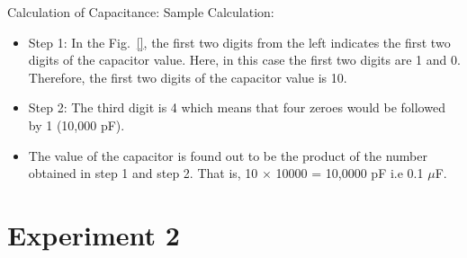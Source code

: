 \documentclass[9pt]{scrreprt}
\begin{document}
Calculation of Capacitance:
Sample Calculation:
\begin{itemize}
\item Step 1: In the Fig.~\ref{}, the first two digits from the left indicates the first two digits of the
capacitor value. Here, in this case the first two digits are 1 and 0. Therefore, the first two digits of
the capacitor value is 10.
\item Step 2: The third digit is 4 which means that four zeroes would be followed by 1 (10,000 pF).
\item The value of the capacitor is found out to be the product of the number obtained in step 1 and step
2. That is, 10 $\times$ 10000 = 10,0000 pF i.e 0.1 $\mu$F.
\end{itemize}
\chapter*{Experiment 2}
\end{document}
